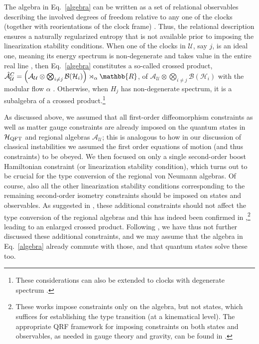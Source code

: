 \documentclass[]{jkpaper}
\theoremstyle{plain}
\theoremstyle{definition}
\begin{document}
The algebra in Eq.~\eqref{algebra} can be written as a set of relational observables describing the involved degrees of freedom relative to any one of the clocks (together with reorientations of the clock frame) \cite{DeVuyst:2024pop,DVEHK}. Thus, the relational description ensures a naturally regularized entropy that is not available prior to imposing the linearization stability conditions. When one of the clocks in $\mathcal U$, say $j$, is an ideal one, meaning its energy spectrum is non-degenerate and takes value in the entire real line \cite{Hoehn:2019fsy}, then Eq.~\eqref{algebra} constitutes a so-called  crossed product, $\hat{\mathcal{A}}^C_\mathcal{U}=\qty\Big(\mathcal{A}_\mathcal{U}\otimes\bigotimes_{i\neq j}\mathcal{B}(\mathcal{H}_i))\rtimes_\alpha \mathbb{R}$, of $\mathcal{A}_\mathcal{U}\otimes\bigotimes_{i\neq j}\mathcal{B}(\mathcal{H}_i)$ with the modular flow $\alpha$ \cite{Witten:2021unn,Chandrasekaran:2022cip,Jensen:2023yxy,DVEHK}. Otherwise, when $H_j$ has non-degenerate spectrum, it is a subalgebra of a crossed product.\footnote{These considerations can also be extended to clocks with degenerate spectrum \cite{DVEHK}.}

As discussed above, we assumed that all first-order diffeomorphism constraints as well as matter gauge constraints are already imposed on the quantum states in $\mathcal{H}_{\rm QFT}$ and regional algebras $\mathcal{A}_\mathcal{U}$; this is analogous to how in our discussion of classical instabilities we assumed the first order equations of motion (and thus constraints) to be obeyed. We then focused on only a single second-order boost Hamiltonian constraint (or linearization stability condition), which turns out to be crucial for the type conversion of the regional von Neumann algebras. Of course, also all the other linearization stability conditions corresponding to the remaining second-order isometry constraints should be imposed on states and observables. As suggested in \cite{Chandrasekaran:2022cip}, these additional constraints should not affect the type conversion of the regional algebras and this has indeed been confirmed in \cite{Fewster:2024pur,AliAhmad:2024eun},\footnote{These works impose constraints only on the algebra, but not states, which suffices for establishing the type transition (at a kinematical level). The appropriate QRF framework for imposing constraints on both states and observables, as needed in gauge theory and gravity, can be found in \cite{delaHamette:2021oex}.} leading to an enlarged crossed product. Following \cite{Chandrasekaran:2022cip}, we have thus not further discussed these additional constraints, and we may assume that the algebra in Eq.~\eqref{algebra} already commute with those, and that quantum states solve these too.
\end{document}

